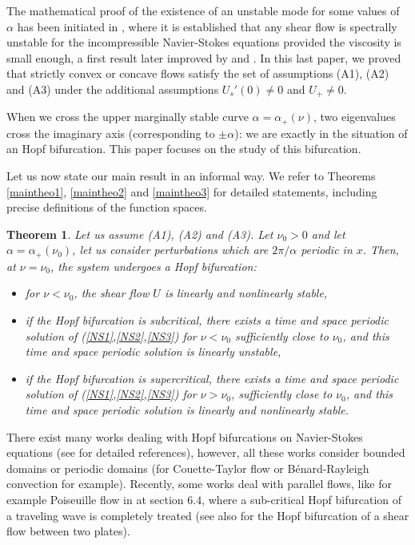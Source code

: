 \documentclass[11pt]{article}
\newtheorem{theorem}{Theorem}
\begin{document}
The mathematical proof of the existence of an unstable
mode for some values of $\alpha$
has been initiated in \cite{Guo}, where it is 
established that any shear flow is spectrally
unstable for the incompressible Navier-Stokes equations provided the viscosity is small enough,
a first result later improved by \cite{Zhang} and \cite{BG4}. In this last paper, 
we proved that strictly convex or concave flows satisfy the set of assumptions (A1), (A2) and (A3)
under the additional assumptions $U_s'(0) \ne 0$ and $U_+ \ne 0$.

When we cross the upper marginally stable curve $\alpha = \alpha_+(\nu)$, two eigenvalues cross
the imaginary axis (corresponding to $\pm \alpha$): we are exactly in the situation of an Hopf bifurcation.
This paper focuses on the study of this bifurcation.

Let us now state our main result in an informal way. We refer to Theorems \ref{maintheo1}, \ref{maintheo2} 
and \ref{maintheo3} for detailed statements, including precise definitions of the function
spaces.

\begin{theorem}\label{maintheo}
Let us assume (A1), (A2) and (A3).
Let $\nu_0 > 0$ and let $\alpha = \alpha_+(\nu_0)$, let us consider
perturbations which are $2 \pi / \alpha$ periodic in $x$.
Then, at $\nu=\nu_0$, the system undergoes a Hopf bifurcation:
\begin{itemize}

\item for $\nu < \nu_0$, the shear flow $U$ is linearly and nonlinearly stable,

\item if the Hopf bifurcation is subcritical, there exists a time and space periodic solution
of (\ref{NS1},\ref{NS2},\ref{NS3}) for $\nu < \nu_0$ sufficiently close to $\nu_0$,
and this time and space periodic solution is linearly unstable,

\item if the Hopf bifurcation is supercritical, there exists a time and space periodic solution
of (\ref{NS1},\ref{NS2},\ref{NS3}) for $\nu > \nu_0$, sufficiently close to $\nu_0$, and this
time and space periodic solution is linearly and nonlinearly stable.

\end{itemize}

\end{theorem}


There exist many works dealing with Hopf bifurcations on Navier-Stokes equations (see \cite{Haragus}
for detailed references), however, all these works consider bounded domains or periodic domains
(for Couette-Taylor flow \cite{CI} or Bénard-Rayleigh convection for example).
Recently, some works  deal with parallel flows, like 
for example Poiseuille flow in \cite{Charru} 
at section $6.4$, where a sub-critical Hopf bifurcation of a traveling wave is completely treated
(see also \cite{BHG} for the Hopf bifurcation of a shear flow between two plates).
\end{document}
